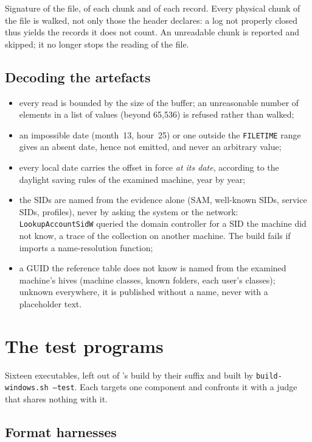 \documentclass[11pt,a4paper,oneside]{report}
\begin{document}
Signature of the file, of each chunk and of each record. Every physical chunk
of the file is walked, not only those the header declares: a log not properly
closed thus yields the records it does not count. An unreadable chunk is
reported and skipped; it no longer stops the reading of the file.

\section{Decoding the artefacts}

\begin{itemize}
  \item every read is bounded by the size of the buffer; an unreasonable
    number of elements in a list of values (beyond 65,536) is refused rather
    than walked;
  \item an impossible date (month~13, hour~25) or one outside the
    \texttt{FILETIME} range gives an absent date, hence not emitted, and never
    an arbitrary value;
  \item every local date carries the offset in force \emph{at its date},
    according to the daylight saving rules of the examined machine, year by
    year;
  \item the SIDs are named from the evidence alone (SAM, well-known SIDs,
    service SIDs, profiles), never by asking the system or the network:
    \texttt{LookupAccountSidW} queried the domain controller for a SID the
    machine did not know, a trace of the collection on another machine. The
    build fails if  imports a name-resolution function;
  \item a GUID the reference table does not know is named from the examined
    machine's hives (machine classes, known folders, each user's classes);
    unknown everywhere, it is published without a name, never with a
    placeholder text.
\end{itemize}

\chapter{The test programs}\label{ch:harnais}

Sixteen executables, left out of \wac{}'s build by their
 suffix and built by \texttt{build-windows.sh --test}.
Each targets one component and confronts it with a judge that shares nothing
with it.

\section{Format harnesses}
\end{document}
